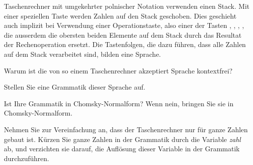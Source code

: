 Taschenrechner mit umgekehrter polnischer Notation verwenden einen Stack.
Mit einer speziellen Taste  werden Zahlen auf den Stack
geschoben. Dies geschieht auch implizit bei Verwendung einer
Operationstaste, also einer der Tasten \keys{{$+$}}, \keys{{$-$}},
\keys{{$\times$}}, \keys{{$\div$}}, die ausserdem die obersten
beiden Elemente auf dem Stack durch das Resultat der Rechenoperation 
ersetzt. Die Tastenfolgen, die dazu führen, dass alle Zahlen auf dem 
Stack verarbeitet sind, bilden eine Sprache.

\begin{teilaufgaben}
\item Warum ist die von so einem Taschenrechner akzeptiert Sprache
kontextfrei?
\item Stellen Sie eine Grammatik dieser Sprache auf.
\item Ist Ihre Grammatik in Chomsky-Normalform? Wenn nein, bringen Sie sie
in Chomsky-Normalform.
\end{teilaufgaben}

\begin{hinweis}
Nehmen Sie zur Vereinfachung an, dass der Taschenrechner nur für ganze
Zahlen gebaut ist. Kürzen Sie ganze Zahlen in der Grammatik durch
die Variable \textsl{zahl} ab, und verzichten sie darauf, die Auflösung
dieser Variable in der Grammatik durchzuführen.
\end{hinweis}

